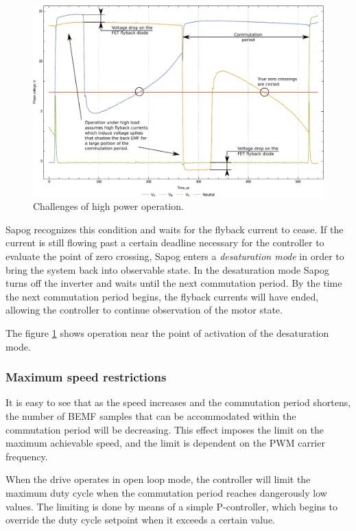 \documentclass{zubaxdoc}
\begin{document}
\begin{figure}[hbtp]
    \centering
	\includegraphics[width=\textwidth]{phase_voltages_at_high_load}
	\caption{Challenges of high power operation.
	\label{phase_voltages_at_high_load}}
\end{figure}

Sapog recognizes this condition and waits for the flyback current to cease.
If the current is still flowing past a certain deadline necessary for the controller to evaluate the
point of zero crossing, Sapog enters a \emph{desaturation mode} in order to bring the system
back into observable state.
In the desaturation mode Sapog turns off the inverter and waits until the next commutation period.
By the time the next commutation period begins, the flyback currents will have ended,
allowing the controller to continue observation of the motor state.

The figure \ref{phase_voltages_at_high_load} shows operation near the point of activation
of the desaturation mode.

\subsubsection{Maximum speed restrictions}

It is easy to see that as the speed increases and the commutation period shortens,
the number of BEMF samples that can be accommodated within the commutation period will be decreasing.
This effect imposes the limit on the maximum achievable speed, and the limit is dependent on the PWM
carrier frequency.

When the drive operates in open loop mode, the controller will limit the maximum duty cycle
when the commutation period reaches dangerously low values.
The limiting is done by means of a simple P-controller,
which begins to override the duty cycle setpoint when it exceeds a certain value.
\end{document}
